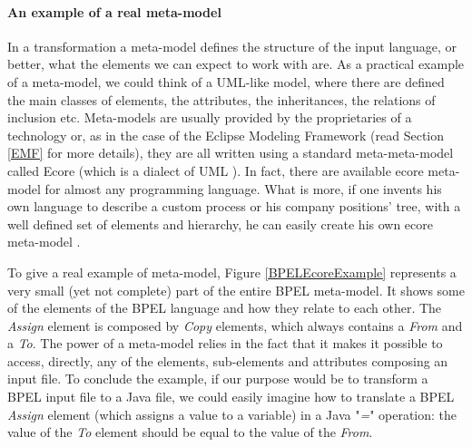 \paragraph{An example of a real meta-model}
\label{metamodelExample}
In a transformation a meta-model defines the structure of the input language, or better, what the elements we can expect to work with are. As a practical example of a meta-model, we could think of a UML-like model, where there are defined the main classes of elements, the attributes, the inheritances, the relations of inclusion etc. Meta-models are usually provided by the proprietaries of a technology or, as in the case of the Eclipse Modeling Framework (read Section \ref{EMF} for more details), they are all written using a standard meta-meta-model called Ecore (which is a dialect of UML \cite{EcoreAPI}). In fact, there are available ecore meta-model for almost any programming language. What is more, if one invents his own language to describe a custom process or his company positions' tree, with a well defined set of elements and hierarchy, he can easily create his own ecore meta-model \cite{EcoreExample}.

To give a real example of meta-model, Figure \ref{BPELEcoreExample} represents a very small (yet not complete) part of the entire BPEL meta-model. It shows some of the elements of the BPEL language and how they relate to each other. The \textit{Assign} element is composed by \textit{Copy} elements, which always contains a \textit{From} and a \textit{To}. The power of a meta-model relies in the fact that it makes it possible to access, directly, any of the elements, sub-elements and attributes composing an input file. To conclude the example, if our purpose would be to transform a BPEL input file to a Java file, we could easily imagine how to translate a BPEL \textit{Assign} element (which assigns a value to a variable) in a Java "\textit{=}" operation: the value of the \textit{To} element should be equal to the value of the \textit{From}. 

